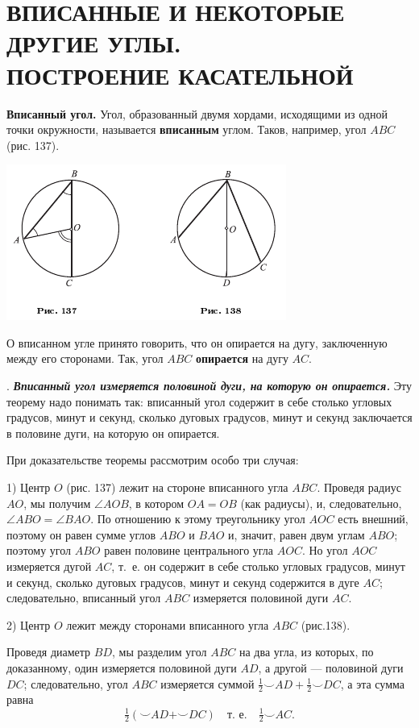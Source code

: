 \documentclass[oneside]{book}
\begin{document}
\section{ВПИСАННЫЕ И НЕКОТОРЫЕ ДРУГИЕ УГЛЫ.\\
ПОСТРОЕНИЕ КАСАТЕЛЬНОЙ}

\textbf{Вписанный угол.}
Угол, образованный двумя хордами, исходящими из одной точки окружности, называется \textbf{вписанным} углом.
Таков, например, угол $ABC$ (рис. 137).

\includegraphics{pics/ris-137-138}

О вписанном угле принято говорить, что он опирается на дугу, заключенную между его сторонами.
Так, угол $ABC$ \textbf{опирается} на дугу $AC$.

.
\textbf{\emph{Вписанный угол измеряется половиной дуги, на которую он опирается.}}
Эту теорему надо понимать так:
вписанный угол содержит в себе столько угловых градусов, минут и секунд, сколько дуговых градусов, минут и секунд заключается в половине дуги, на которую он опирается.

При доказательстве теоремы рассмотрим особо три случая:

1) Центр $O$ (рис. 137) лежит на стороне вписанного угла $ABC$.
Проведя радиус $AO$, мы получим $\angle AOB$, в котором $OA = OB$ (как радиусы), и, следовательно, $\angle ABO=\angle BAO$.
По отношению к этому треугольнику угол $AOC$ есть внешний, поэтому он равен сумме углов $ABO$ и $BAO$ и, значит, равен двум углам $ABO$;
поэтому угол $ABO$ равен половине центрального угла $AOC$.
Но угол $AOC$ измеряется дугой $AC$, т.~е.
он содержит в себе столько угловых градусов, минут и секунд, сколько дуговых градусов, минут и секунд содержится в дуге $AC$;
следовательно, вписанный угол $ABC$ измеряется половиной дуги $AC$.

2) Центр $O$ лежит между сторонами вписанного угла $ABC$ (рис.138).

Проведя диаметр $BD$, мы разделим угол $ABC$ на два угла, из которых, по доказанному, один измеряется половиной дуги $AD$, а другой — половиной дуги $DC$;
следовательно, угол $ABC$ измеряется суммой
$\tfrac12{\smallsmile}AD+\tfrac12{\smallsmile}DC$, а эта сумма равна 
\[\tfrac12({\smallsmile}AD+{\smallsmile}DC)
\quad
\text{т.~е.}
\quad
\tfrac12{\smallsmile}AC.
\]
\end{document}
